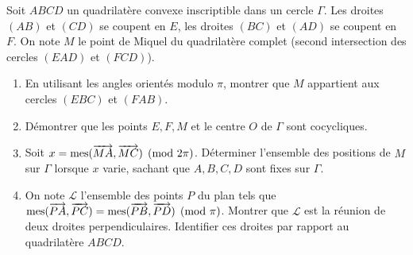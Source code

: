 \documentclass[11pt]{article}
\begin{document}
\begin{exercice}
Soit $ABCD$ un quadrilatère convexe inscriptible dans un cercle $\Gamma$. Les droites $(AB)$ et $(CD)$ se coupent en $E$, les droites $(BC)$ et $(AD)$ se coupent en $F$. On note $M$ le point de Miquel du quadrilatère complet (second intersection des cercles $(EAD)$ et $(FCD)$).
\begin{enumerate}
    \item En utilisant les angles orientés modulo $\pi$, montrer que $M$ appartient aux cercles $(EBC)$ et $(FAB)$.
    \item Démontrer que les points $E, F, M$ et le centre $O$ de $\Gamma$ sont cocycliques.
    \item Soit $x = \mathop{\mathrm{mes}}\nolimits(\overrightarrow{MA},\overrightarrow{MC}) \pmod{2\pi}$. Déterminer l'ensemble des positions de $M$ sur $\Gamma$ lorsque $x$ varie, sachant que $A, B, C, D$ sont fixes sur $\Gamma$.
    \item On note $\mathcal{L}$ l'ensemble des points $P$ du plan tels que $\mathop{\mathrm{mes}}\nolimits(\overrightarrow{PA},\overrightarrow{PC}) = \mathop{\mathrm{mes}}\nolimits(\overrightarrow{PB},\overrightarrow{PD}) \pmod{\pi}$.
    Montrer que $\mathcal{L}$ est la réunion de deux droites perpendiculaires. Identifier ces droites par rapport au quadrilatère $ABCD$.
\end{enumerate}
\end{exercice}
\end{document}
